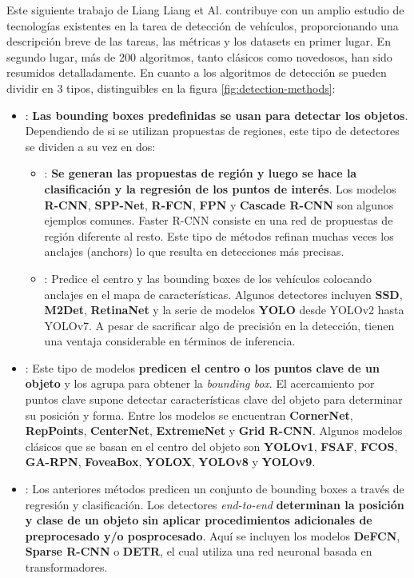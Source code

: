 \documentclass[11pt]{article}
\begin{document}
Este siguiente trabajo de Liang Liang et Al.\cite{s24103088} contribuye con un amplio estudio de tecnologías existentes en la tarea de detección de vehículos, proporcionando una descripción breve de las tareas, las métricas y los datasets en primer lugar. En segundo lugar, más de 200 algoritmos, tanto clásicos como novedosos, han sido resumidos detalladamente. En cuanto a los algoritmos de detección se pueden dividir en 3 tipos, distinguibles en la figura \ref{fig:detection-methods}:
\begin{itemize}
    \item[Anchor-based]: \textbf{Las bounding boxes predefinidas se usan para detectar los objetos}. Dependiendo de si se utilizan propuestas de regiones, este tipo de detectores se dividen a su vez en dos:
    \begin{itemize}
        \item[Two-stage]: \textbf{Se generan las propuestas de región y luego se hace la clasificación y la regresión de los puntos de interés}. Los modelos \textbf{R-CNN}, \textbf{SPP-Net}, \textbf{R-FCN}, \textbf{FPN} y \textbf{Cascade R-CNN} son algunos ejemplos comunes. Faster R-CNN consiste en una red de propuestas de región diferente al resto. Este tipo de métodos refinan muchas veces los anclajes (anchors) lo que resulta en detecciones más precisas.
        \item[One-stage]: Predice el centro y las bounding boxes de los vehículos colocando anclajes en el mapa de características. Algunos detectores incluyen \textbf{SSD}, \textbf{M2Det}, \textbf{RetinaNet} y la serie de modelos \textbf{YOLO} desde YOLOv2 hasta YOLOv7. A pesar de sacrificar algo de precisión en la detección, tienen una ventaja considerable en términos de inferencia.
    \end{itemize}
    \item[Anchor-free]: Este tipo de modelos \textbf{predicen el centro o los puntos clave de un objeto} y los agrupa para obtener la \textit{bounding box}. El acercamiento por puntos clave supone detectar características clave del objeto para determinar su posición y forma. Entre los modelos se encuentran \textbf{CornerNet}, \textbf{RepPoints}, \textbf{CenterNet}, \textbf{ExtremeNet} y \textbf{Grid R-CNN}. Algunos modelos clásicos que se basan en el centro del objeto son \textbf{YOLOv1}, \textbf{FSAF}, \textbf{FCOS}, \textbf{GA-RPN}, \textbf{FoveaBox}, \textbf{YOLOX}, \textbf{YOLOv8} y \textbf{YOLOv9}.
    \item[End-to-end]: Los anteriores métodos predicen un conjunto de bounding boxes a través de regresión y clasificación. Los detectores \textit{end-to-end} \textbf{determinan la posición y clase de un objeto sin aplicar procedimientos adicionales de preprocesado y/o posprocesado}. Aquí se incluyen los modelos \textbf{DeFCN}, \textbf{Sparse R-CNN} o \textbf{DETR}, el cual utiliza una red neuronal basada en transformadores. 
    \end{itemize}
\end{document}
